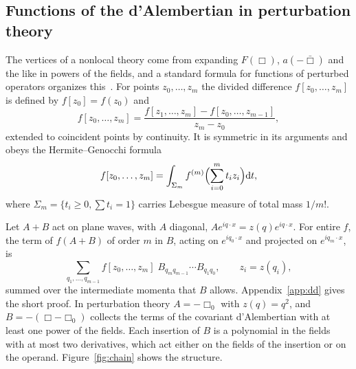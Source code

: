 \documentclass[a4paper,11pt]{article}
\newcommand{\dd}{\mathrm{d}}
\begin{document}
\subsection{Functions of the d'Alembertian in perturbation theory}
\label{sec:DK}

The vertices of a nonlocal theory come from expanding $F(\Box)$, $a(-\bar\Box)$ and the like in powers of the fields, and a standard formula for functions of perturbed operators organizes this~\cite{DaletskiiKrein1965}. For points $z_0,\dots,z_m$ the divided difference $f[z_0,\dots,z_m]$ is defined by $f[z_0]=f(z_0)$ and
\[
f[z_0,\dots,z_m]=\frac{f[z_1,\dots,z_m]-f[z_0,\dots,z_{m-1}]}{z_m-z_0},
\]
extended to coincident points by continuity. It is symmetric in its arguments and obeys the Hermite--Genocchi formula~\cite{deBoor2005}
\begin{equation}
\label{eq:HG}
f[z_0,\dots,z_m]=\int_{\Sigma_m}f^{(m)}\Bigl(\sum_{i=0}^m t_iz_i\Bigr)\dd t,
\end{equation}
where $\Sigma_m=\{t_i\ge0,\sum t_i=1\}$ carries Lebesgue measure of total mass $1/m!$.

Let $A+B$ act on plane waves, with $A$ diagonal, $Ae^{iq\cdot x}=z(q)e^{iq\cdot x}$. For entire $f$, the term of $f(A+B)$ of order $m$ in $B$, acting on $e^{iq_0\cdot x}$ and projected on $e^{iq_m\cdot x}$, is
\begin{equation}
\label{eq:DK}
\sum_{q_1,\dots,q_{m-1}}f[z_0,\dots,z_m]\;B_{q_mq_{m-1}}\cdots B_{q_1q_0},\qquad z_i=z(q_i),
\end{equation}
summed over the intermediate momenta that $B$ allows. Appendix~\ref{app:dd} gives the short proof. In perturbation theory $A=-\Box_0$ with $z(q)=q^2$, and $B=-(\Box-\Box_0)$ collects the terms of the covariant d'Alembertian with at least one power of the fields. Each insertion of $B$ is a polynomial in the fields with at most two derivatives, which act either on the fields of the insertion or on the operand. Figure~\ref{fig:chain} shows the structure.
\end{document}

